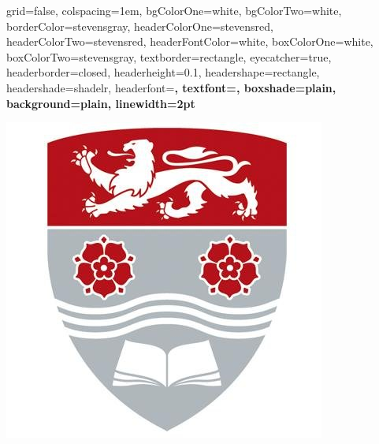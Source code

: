 \documentclass[portrait,final,archD,fontscale=0.477]{baposter}
\begin{document}


\begin{poster}%
  {
  grid=false,
  colspacing=1em,
  bgColorOne=white,
  bgColorTwo=white,
  borderColor=stevensgray,
  headerColorOne=stevensred,
  headerColorTwo=stevensred,
  headerFontColor=white,
  boxColorOne=white,
  boxColorTwo=stevensgray,
  textborder=rectangle,
  eyecatcher=true,
  headerborder=closed,
  headerheight=0.1\textheight,
  headershape=rectangle,
  headershade=shadelr,
  headerfont=\Large\bf, %
  textfont={\setlength{\parindent}{1.5em}},
  boxshade=plain,
  background=plain,
  linewidth=2pt
  }
  {\begin{minipage}{7em}
   \centering 
   \includegraphics[width=1.28\linewidth]{images-posterlatinr/logo-lancaster.jpeg}

\end{minipage}}
\end{poster}
\end{document}
